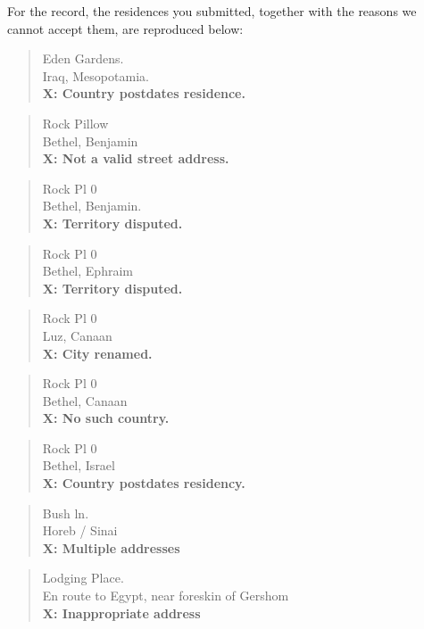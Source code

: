 {{For the record, the residences you submitted, together with the reasons we cannot accept them, are reproduced below:

\begin{quote}
Eden Gardens.\\Iraq, Mesopotamia.\\\textbf{X: Country postdates residence.}
\end{quote}

\begin{quote}
Rock Pillow\\Bethel, Benjamin\\\textbf{X: Not a valid street address.}
\end{quote}

\begin{quote}
Rock Pl 0\\Bethel, Benjamin.\\\textbf{X: Territory disputed.}
\end{quote}

\begin{quote}
Rock Pl 0\\Bethel, Ephraim\\\textbf{X: Territory disputed.}
\end{quote}

\begin{quote}
Rock Pl 0\\Luz, Canaan\\\textbf{X: City renamed.}
\end{quote}

\begin{quote}
Rock Pl 0\\Bethel, Canaan\\\textbf{X: No such country.}
\end{quote}

\begin{quote}
Rock Pl 0\\Bethel, Israel\\\textbf{X: Country postdates residency.}
\end{quote}

\begin{quote}
Bush ln.\\Horeb / Sinai\\\textbf{X: Multiple addresses}
\end{quote}

\begin{quote}
Lodging Place.\\En route to Egypt, near foreskin of Gershom\\\textbf{X: Inappropriate address}
\end{quote}

}}
